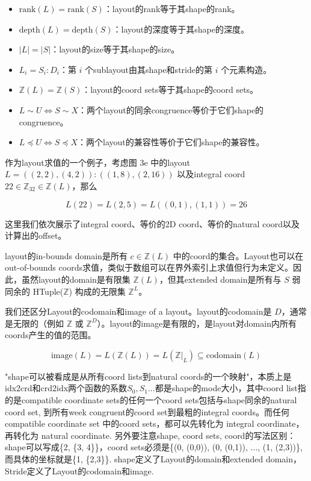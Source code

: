 \documentclass{article}
\begin{document}
\begin{itemize}
\item \(\text{rank}(L) = \text{rank}(S)\)：layout的rank等于其shape的rank。
\item \(\text{depth}(L) = \text{depth}(S)\)：layout的深度等于其shape的深度。
\item \(|L| = |S|\)：layout的size等于其shape的size。
\item \( L_i = S_i : D_i \)：第 \( i \) 个sublayout由其shape和stride的第 \( i \) 个元素构造。
\item \( \mathbb{Z}(L) = \mathbb{Z}(S) \)：layout的coord sets等于其shape的coord sets。
\item \( L \sim U \Leftrightarrow S \sim X \)：两个layout的同余congruence等价于它们shape的congruence。
\item \( L \preceq U \Leftrightarrow S \preceq X \)：两个layout的兼容性等价于它们shape的兼容性。
\end{itemize}

作为layout求值的一个例子，考虑图 3e 中的layout \( L = ((2, 2), (4, 2)) : ((1, 8), (2, 16)) \) 以及integral coord \( 22 \in \mathbb{Z}_{32} \in \mathbb{Z}(L) \)，那么

\[
L(22) = L(2, 5) = L((0, 1), (1, 1)) = 26
\]

这里我们依次展示了integral coord、等价的2D coord、等价的natural coord以及计算出的offset。

layout的in-bounds domain是所有 \( c \in \mathbb{Z}(L) \) 中的coord的集合。Layout也可以在out-of-bounds coords求值，类似于数组可以在界外索引上求值但行为未定义。因此，虽然layout的domain是有限集 \( \mathbb{Z}(L) \)，但其extended domain是所有与 \( S \) 弱同余的 HTuple(\( \mathbb{Z} \)) 构成的无限集 \( \mathbb{Z}^L \)。

我们还区分Layout的codomain和image of a layout。layout的codomain是 \( D \)，通常是无限的（例如 \( \mathbb{Z} \) 或 \( \mathbb{Z}^D \)）。layout的image是有限的，是layout对domain内所有coords产生的值的范围。

\[
\text{image}(L) = L(\mathbb{Z}(L)) = L(\mathbb{Z}|_{L}) \subseteq \text{codomain}(L)
\]

\begin{mycomment}
    "shape可以被看成是从所有coord lists到natural coords的一个映射"，本质上是idx2crd和crd2idx两个函数的系数$S_{0}, S_{1}...$都是shape的mode大小，其中coord list指的是compatible coordinate sets的任何一个coord sets包括与shape同余的natural coord set, 到所有week congruent的coord set到最粗的integral coords。而任何 compatible coordinate set 中的coord sets，都可以先转化为 integral coordinate，再转化为 natural coordinate.
    另外要注意shape, coord sets, coord的写法区别： shape可以写成\{2, \{3, 4\}\}，coord sets必须是\{(0, (0,0)), (0, (0,1)), ..., (1, (2,3))\}, 而具体的坐标就是\{1, \{2,3\}\}. shape定义了Layout的domain和extended domain，Stride定义了Layout的codomain和image.
\end{mycomment}
\end{document}
